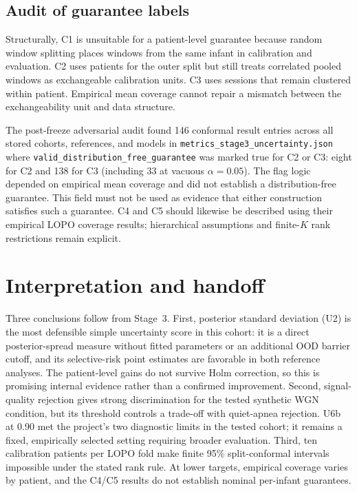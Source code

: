 \subsection{Audit of guarantee labels}

Structurally, C1 is unsuitable for a patient-level guarantee because random window splitting places windows from the same infant in calibration and evaluation. C2 uses patients for the outer split but still treats correlated pooled windows as exchangeable calibration units. C3 uses sessions that remain clustered within patient. Empirical mean coverage cannot repair a mismatch between the exchangeability unit and data structure.

{\sloppy The post-freeze adversarial audit found 146 conformal result entries across all stored cohorts, references, and models in \texttt{metrics\_stage3\_uncertainty.json} where \texttt{valid\_\allowbreak distribution\_\allowbreak free\_\allowbreak guarantee} was marked true for C2 or C3: eight for C2 and 138 for C3 (including 33 at vacuous $\alpha=0.05$). The flag logic depended on empirical mean coverage and did not establish a distribution-free guarantee. This field must not be used as evidence that either construction satisfies such a guarantee. C4 and C5 should likewise be described using their empirical LOPO coverage results; hierarchical assumptions and finite-$K$ rank restrictions remain explicit.\par}

\section{Interpretation and handoff}

Three conclusions follow from Stage~3. First, posterior standard deviation (U2) is the most defensible simple uncertainty score in this cohort: it is a direct posterior-spread measure without fitted parameters or an additional OOD barrier cutoff, and its selective-risk point estimates are favorable in both reference analyses. The patient-level gains do not survive Holm correction, so this is promising internal evidence rather than a confirmed improvement. Second, signal-quality rejection gives strong discrimination for the tested synthetic WGN condition, but its threshold controls a trade-off with quiet-apnea rejection. U6b at 0.90 met the project's two diagnostic limits in the tested cohort; it remains a fixed, empirically selected setting requiring broader evaluation. Third, ten calibration patients per LOPO fold make finite 95\% split-conformal intervals impossible under the stated rank rule. At lower targets, empirical coverage varies by patient, and the C4/C5 results do not establish nominal per-infant guarantees.

